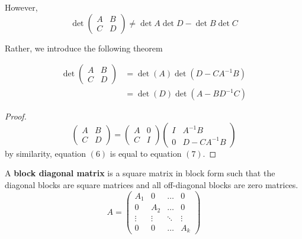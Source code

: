   However, 
  \begin{equation}
    \det{\begin{pmatrix} A&B\\C&D \end{pmatrix}} \neq \det{A} \det{D} - \det{B} \det{C}
  \end{equation}

  Rather, we introduce the following theorem

  \begin{theorem}
    \begin{align}
      \det{\begin{pmatrix} A&B\\C&D \end{pmatrix}}  & = \det{(A)} \det{(D - C A^{-1} B)} \\
      & = \det{(D)} \det{(A - B D^{-1} C)}
    \end{align}
  \end{theorem}
  \begin{proof}
    \begin{equation}
      \begin{pmatrix} A&B\\C&D\end{pmatrix} = \begin{pmatrix}
      A&0\\C&I\end{pmatrix} \begin{pmatrix}
      I& A^{-1} B \\ 0 & D - C A^{-1} B
      \end{pmatrix}
    \end{equation}
    by similarity, equation $(6)$ is equal to equation $(7)$. 
  \end{proof}

  \begin{definition}
    A \textbf{block diagonal matrix} is a square matrix in block form such that the diagonal blocks are square matrices and all off-diagonal blocks are zero matrices. 
    \begin{equation}
      A = \begin{pmatrix}
      A_1&0&\ldots&0\\
      0&A_2&\ldots&0\\
      \vdots&\vdots&\ddots&\vdots\\
      0&0&\ldots&A_k
      \end{pmatrix}
    \end{equation}
  \end{definition}

